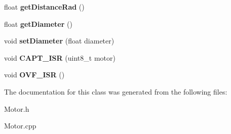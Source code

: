 \begin{DoxyCompactItemize}
\item 
\mbox{\label{class_motor_a94587db25ab4933d8e19f51eeeccb7ce}} 
float {\bfseries get\+Distance\+Rad} ()
\item 
\mbox{\label{class_motor_af98e004e4e7b84ba55afa583427efcea}} 
float {\bfseries get\+Diameter} ()
\item 
\mbox{\label{class_motor_a40ee451fbda9157a35f7b6ea64f11363}} 
void {\bfseries set\+Diameter} (float diameter)
\item 
\mbox{\label{class_motor_aef53dc289cf7f68db5f07a88cf214f25}} 
void {\bfseries C\+A\+P\+T\+\_\+\+I\+SR} (uint8\+\_\+t motor)
\item 
\mbox{\label{class_motor_a0d6208b43d7c5a88f49c1baf63310606}} 
void {\bfseries O\+V\+F\+\_\+\+I\+SR} ()
\end{DoxyCompactItemize}


The documentation for this class was generated from the following files\+:\begin{DoxyCompactItemize}
\item 
Motor.\+h\item 
Motor.\+cpp\end{DoxyCompactItemize}
